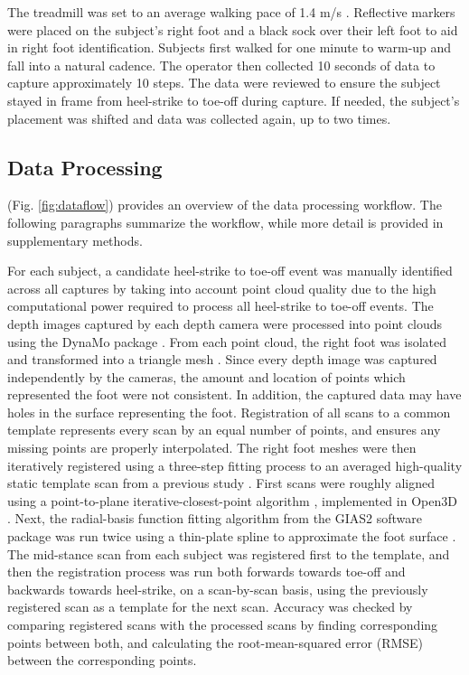 \documentclass[preprint]{elsarticle}
\begin{document}
The treadmill was set to an average walking pace of 1.4 m/s \citep{Browning2006}.
Reflective markers were placed on the subject's right foot and a black sock over their left foot to aid in right foot identification.
Subjects first walked for one minute to warm-up and fall into a natural cadence.
The operator then collected 10 seconds of data to capture approximately 10 steps.
The data were reviewed to ensure the subject stayed in frame from heel-strike to toe-off during capture. If needed, the subject's placement was shifted and data was collected again, up to two times.

\hypertarget{data-processing}{%
\subsection{Data Processing}\label{data-processing}}

(Fig. \ref{fig:dataflow}) provides an overview of the data processing workflow.
The following paragraphs summarize the workflow, while more detail is provided in supplementary methods.

For each subject, a candidate heel-strike to toe-off event was manually identified across all captures by taking into account point cloud quality due to the high computational power required to process all heel-strike to toe-off events.
The depth images captured by each depth camera were processed into point clouds using the DynaMo package \citep{Boppana2019}.
From each point cloud, the right foot was isolated and transformed into a triangle mesh \citep{Rusu2011, Fischler1981, Bernardini1999, Zhou2018}.
Since every depth image was captured independently by the cameras, the amount and location of points which represented the foot were not consistent.
In addition, the captured data may have holes in the surface representing the foot.
Registration of all scans to a common template represents every scan by an equal number of points, and ensures any missing points are properly interpolated.
The right foot meshes were then iteratively registered using a three-step fitting process to an averaged high-quality static template scan from a previous study \citep{Reed2013}.
First scans were roughly aligned using a point-to-plane iterative-closest-point algorithm \citep{Chen1992}, implemented in Open3D \citep{Zhou2018}.
Next, the radial-basis function fitting algorithm from the GIAS2 software package \citep{Zhang2016} was run twice using a thin-plate spline to approximate the foot surface \citep{Park2015a, KIM2016}.
The mid-stance scan from each subject was registered first to the template, and then the registration process was run both forwards towards toe-off and backwards towards heel-strike, on a scan-by-scan basis, using the previously registered scan as a template for the next scan.
Accuracy was checked by comparing registered scans with the processed scans by finding corresponding points between both, and calculating the root-mean-squared error (RMSE) between the corresponding points.
\end{document}
